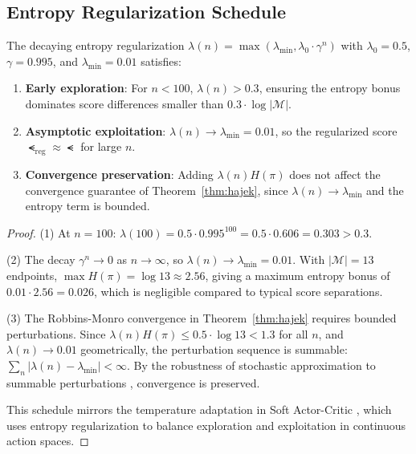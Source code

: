 \subsection{Entropy Regularization Schedule}

\begin{proposition}
\label{prop:entropy}
The decaying entropy regularization $\lambda(n) = \max(\lambda_{\min}, \lambda_0 \cdot \gamma^n)$ with $\lambda_0 = 0.5$, $\gamma = 0.995$, and $\lambda_{\min} = 0.01$ satisfies:
\begin{enumerate}
    \item \textbf{Early exploration}: For $n < 100$, $\lambda(n) > 0.3$, ensuring the entropy bonus dominates score differences smaller than $0.3 \cdot \log |\mathcal{M}|$.
    \item \textbf{Asymptotic exploitation}: $\lambda(n) \to \lambda_{\min} = 0.01$, so the regularized score $\smt_{\text{reg}} \approx \smt$ for large $n$.
    \item \textbf{Convergence preservation}: Adding $\lambda(n) H(\pi)$ does not affect the convergence guarantee of Theorem~\ref{thm:hajek}, since $\lambda(n) \to \lambda_{\min}$ and the entropy term is bounded.
\end{enumerate}
\end{proposition}

\begin{proof}
(1) At $n=100$: $\lambda(100) = 0.5 \cdot 0.995^{100} = 0.5 \cdot 0.606 = 0.303 > 0.3$.

(2) The decay $\gamma^n \to 0$ as $n \to \infty$, so $\lambda(n) \to \lambda_{\min} = 0.01$. With $|\mathcal{M}| = 13$ endpoints, $\max H(\pi) = \log 13 \approx 2.56$, giving a maximum entropy bonus of $0.01 \cdot 2.56 = 0.026$, which is negligible compared to typical score separations.

(3) The Robbins-Monro convergence in Theorem~\ref{thm:hajek} requires bounded perturbations. Since $\lambda(n) H(\pi) \leq 0.5 \cdot \log 13 < 1.3$ for all $n$, and $\lambda(n) \to 0.01$ geometrically, the perturbation sequence is summable: $\sum_n |\lambda(n) - \lambda_{\min}| < \infty$. By the robustness of stochastic approximation to summable perturbations \citep{kushner2003stochastic}, convergence is preserved.

This schedule mirrors the temperature adaptation in Soft Actor-Critic \citep{haarnoja2018sac}, which uses entropy regularization to balance exploration and exploitation in continuous action spaces.
\end{proof}

